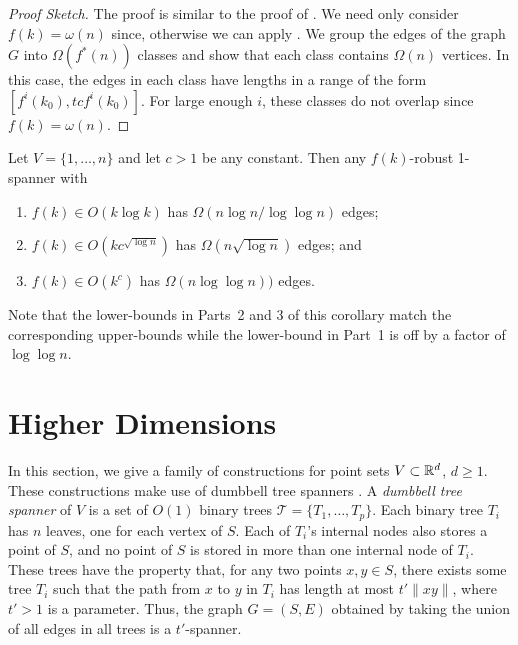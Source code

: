\documentclass{patmorin}
\begin{document}
\begin{proof}[Proof Sketch]
  The proof is similar to the proof of .
  We need only consider $f(k)=\omega(n)$ since, otherwise we can apply
  .  We group the edges of the graph
  $G$ into $\Omega(f^*(n))$ classes and show that each class contains
  $\Omega(n)$ vertices.  In this case, the edges in each class have
  lengths in a range of the form $[f^i(k_0),tcf^{i}(k_0)]$.  For large
  enough $i$, these classes do not overlap since $f(k)=\omega(n)$.
\end{proof}

\begin{cor}
  Let $V=\{1,\ldots,n\}$ and let $c>1$ be any constant.  Then any
  $f(k)$-robust 1-spanner with
  \begin{enumerate}
    \item $f(k)\in O(k\log k)$ has $\Omega(n\log n/\log\log n)$ edges;
    \item $f(k)\in O(kc^{\sqrt{\log n}})$ has $\Omega(n\sqrt{\log n})$
      edges; and
    \item $f(k)\in O(k^{c})$ has $\Omega(n\log\log n))$ edges.
  \end{enumerate}
\end{cor}

Note that the lower-bounds in Parts~2 and 3 of this corollary match the
corresponding upper-bounds while the lower-bound in Part~1 is off by a
factor of $\log\log n$.


\section{Higher Dimensions}

In this section, we give a family of constructions for point sets
$V\subset\mathbb{R}^d$, $d\ge 1$.  These constructions make use of dumbbell
tree spanners \cite[Chapter~11]{ns07}.  A \emph{dumbbell tree spanner}
of $V$ is a set of $O(1)$ binary trees $\mathcal{T}=\{T_1,\ldots,T_p\}$.
Each binary tree $T_i$ has $n$ leaves, one for each vertex of $S$.
Each of $T_i$'s internal nodes also stores a point of $S$, and no point
of $S$ is stored in more than one internal node of $T_i$.  These trees
have the property that, for any two points $x,y\in S$, there exists some
tree $T_i$ such that the path from $x$ to $y$ in $T_i$ has length at
most $t'\|xy\|$, where $t'>1$ is a parameter.  Thus, the graph $G=(S,E)$
obtained by taking the union of all edges in all trees is a $t'$-spanner.
\end{document}
